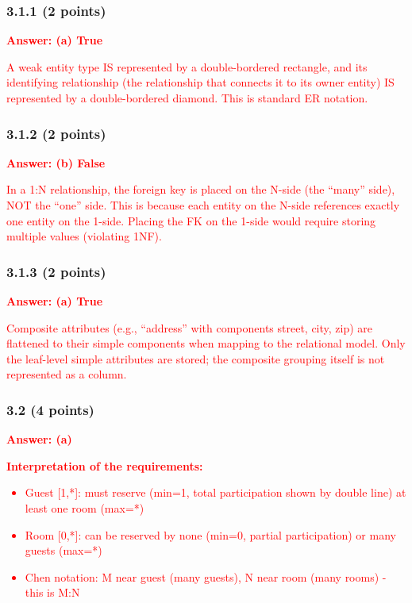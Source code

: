 \documentclass[11pt,a4paper]{article}
\begin{document}
\subsubsection*{3.1.1 (2 points)}
\textcolor{red}{\textbf{Answer: (a) True}}

\textcolor{red}{A weak entity type IS represented by a double-bordered rectangle, and its identifying relationship (the relationship that connects it to its owner entity) IS represented by a double-bordered diamond. This is standard ER notation.}

\subsubsection*{3.1.2 (2 points)}
\textcolor{red}{\textbf{Answer: (b) False}}

\textcolor{red}{In a 1:N relationship, the foreign key is placed on the N-side (the ``many'' side), NOT the ``one'' side. This is because each entity on the N-side references exactly one entity on the 1-side. Placing the FK on the 1-side would require storing multiple values (violating 1NF).}

\subsubsection*{3.1.3 (2 points)}
\textcolor{red}{\textbf{Answer: (a) True}}

\textcolor{red}{Composite attributes (e.g., ``address'' with components street, city, zip) are flattened to their simple components when mapping to the relational model. Only the leaf-level simple attributes are stored; the composite grouping itself is not represented as a column.}

\subsubsection*{3.2 (4 points)}
\textcolor{red}{\textbf{Answer: (a)}}

\textcolor{red}{\textbf{Interpretation of the requirements:}}
\textcolor{red}{\begin{itemize}
\item Guest [1,*]: must reserve (min=1, total participation shown by double line) at least one room (max=*)
\item Room [0,*]: can be reserved by none (min=0, partial participation) or many guests (max=*)
\item Chen notation: M near guest (many guests), N near room (many rooms) - this is M:N
\end{itemize}}
\end{document}

